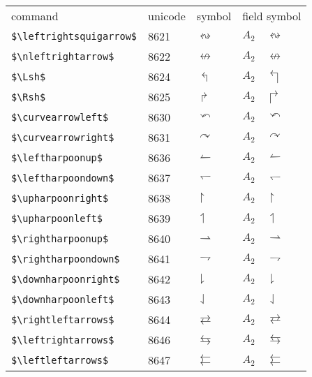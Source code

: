 \documentclass{article}
\begin{document}
\clearpage
\begin{table}
\begin{center}
\begin{tabular}{llll}
 command                       & unicode & symbol                 & field symbol\\
 \verb#$\leftrightsquigarrow$# & 8621    & $\leftrightsquigarrow$ & $A_2\quad \leftrightsquigarrow$\\
 \verb#$\nleftrightarrow$#     & 8622    & $\nleftrightarrow$     & $A_2\quad \nleftrightarrow$\\
 \verb#$\Lsh$#                 & 8624    & $\Lsh$                 & $A_2\quad \Lsh$\\
 \verb#$\Rsh$#                 & 8625    & $\Rsh$                 & $A_2\quad \Rsh$\\
 \verb#$\curvearrowleft$#      & 8630    & $\curvearrowleft$      & $A_2\quad \curvearrowleft$\\
 \verb#$\curvearrowright$#     & 8631    & $\curvearrowright$     & $A_2\quad \curvearrowright$\\
 \verb#$\leftharpoonup$#       & 8636    & $\leftharpoonup$       & $A_2\quad \leftharpoonup$\\
 \verb#$\leftharpoondown$#     & 8637    & $\leftharpoondown$     & $A_2\quad \leftharpoondown$\\
 \verb#$\upharpoonright$#      & 8638    & $\upharpoonright$      & $A_2\quad \upharpoonright$\\
 \verb#$\upharpoonleft$#       & 8639    & $\upharpoonleft$       & $A_2\quad \upharpoonleft$\\
 \verb#$\rightharpoonup$#      & 8640    & $\rightharpoonup$      & $A_2\quad \rightharpoonup$\\
 \verb#$\rightharpoondown$#    & 8641    & $\rightharpoondown$    & $A_2\quad \rightharpoondown$\\
 \verb#$\downharpoonright$#    & 8642    & $\downharpoonright$    & $A_2\quad \downharpoonright$\\
 \verb#$\downharpoonleft$#     & 8643    & $\downharpoonleft$     & $A_2\quad \downharpoonleft$\\
 \verb#$\rightleftarrows$#     & 8644    & $\rightleftarrows$     & $A_2\quad \rightleftarrows$\\
 \verb#$\leftrightarrows$#     & 8646    & $\leftrightarrows$     & $A_2\quad \leftrightarrows$\\
 \verb#$\leftleftarrows$#      & 8647    & $\leftleftarrows$      & $A_2\quad \leftleftarrows$\\

\end{tabular}
\end{center}
\end{table}
\end{document}
